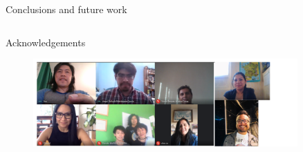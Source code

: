 {\begin{frame}{Conclusions and future work}
\begin{columns}
\begin{column}{.3\linewidth}
    \end{column}
  \end{columns}

\end{frame}
}


{
\begin{frame}{Acknowledgements}


      \begin{figure}
        \centering
        \includegraphics[width=0.9\textwidth]{./figures/team/versions/drawing-v00.png}
      \end{figure}


\end{frame}
}

